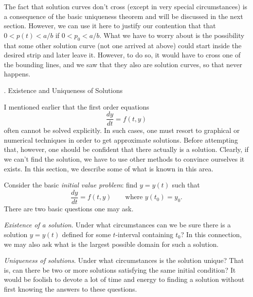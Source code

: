 The fact that solution curves don't cross (except in very special
circumstances) is a consequence of the basic uniqueness theorem and
will be discussed in the next section.
However, we can use it here to justify our contention that
that $0 < p(t) < a/b$  if $0 < p_0 < a/b$.   
What we have to worry about is the possibility
 that some other solution curve (not one
arrived at above) could start inside
the desired strip and later leave it.   However, to do so, it would
have to cross one of the bounding lines, and we saw that they
also are solution curves, so that never happens.

\bigskip

\bigskip

\head \sn. Existence and Uniqueness of Solutions \endhead

I mentioned earlier that the first order equations
$$
  \frac{dy}{dt} = f(t,y)
$$
often cannot be solved explicitly.    In such cases, one must resort
to graphical or numerical techniques in order to get
approximate solutions.  Before attempting that, however, one
should be confident that there actually is a solution.  Clearly,
if we can't find the solution, we have to use other methods to
convince ourselves it exists.   In this section, we describe
some of what is known in this area.

Consider the basic {\it initial value problem}: find $y = y(t)$
such that
$$
\frac{dy}{dt} = f(t,y)\qquad\text{where } y(t_0) = y_0.
$$
There are two basic questions one may ask.
\roster
\item  {\it Existence of a solution}.   Under what circumstances
can we be sure there is a solution $y = y(t)$ defined for some
$t$-interval containing $t_0$?   In this connection, we may also
ask what is the largest possible domain for such a solution.
\item  {\it Uniqueness of solutions}.  Under what circumstances
is the solution unique?  That is, can there be two or more
solutions satisfying the same initial condition?
\endroster
It would be foolish to devote a lot of time and energy to
finding a solution without first knowing the answers to these
questions.

